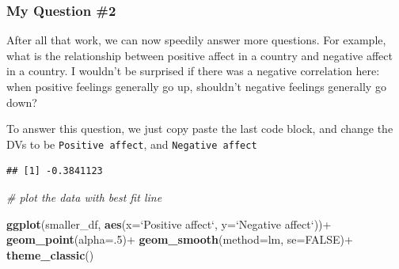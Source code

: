 \documentclass[]{book}
\newenvironment{Shaded}{\begin{snugshade}}{\end{snugshade}}
\newcommand{\KeywordTok}[1]{\textcolor[rgb]{0.13,0.29,0.53}{\textbf{{#1}}}}
\newcommand{\DataTypeTok}[1]{\textcolor[rgb]{0.13,0.29,0.53}{{#1}}}
\newcommand{\DecValTok}[1]{\textcolor[rgb]{0.00,0.00,0.81}{{#1}}}
\newcommand{\StringTok}[1]{\textcolor[rgb]{0.31,0.60,0.02}{{#1}}}
\newcommand{\CommentTok}[1]{\textcolor[rgb]{0.56,0.35,0.01}{\textit{{#1}}}}
\newcommand{\OtherTok}[1]{\textcolor[rgb]{0.56,0.35,0.01}{{#1}}}
\newcommand{\NormalTok}[1]{{#1}}
\theoremstyle{definition}
\theoremstyle{definition}
\theoremstyle{definition}
\theoremstyle{remark}
\begin{document}
\subsubsection{My Question \#2}\label{my-question-2}

After all that work, we can now speedily answer more questions. For
example, what is the relationship between positive affect in a country
and negative affect in a country. I wouldn't be surprised if there was a
negative correlation here: when positive feelings generally go up,
shouldn't negative feelings generally go down?

To answer this question, we just copy paste the last code block, and
change the DVs to be \texttt{Positive\ affect}, and
\texttt{Negative\ affect}

\begin{Shaded}
\end{Shaded}

\begin{verbatim}
## [1] -0.3841123
\end{verbatim}

\begin{Shaded}
\begin{Highlighting}[]
\CommentTok{# plot the data with best fit line}

\KeywordTok{ggplot}\NormalTok{(smaller_df, }\KeywordTok{aes}\NormalTok{(}\DataTypeTok{x=}\StringTok{`}\DataTypeTok{Positive affect}\StringTok{`}\NormalTok{,}
                     \DataTypeTok{y=}\StringTok{`}\DataTypeTok{Negative affect}\StringTok{`}\NormalTok{))+}
\StringTok{  }\KeywordTok{geom_point}\NormalTok{(}\DataTypeTok{alpha=}\NormalTok{.}\DecValTok{5}\NormalTok{)+}
\StringTok{  }\KeywordTok{geom_smooth}\NormalTok{(}\DataTypeTok{method=}\NormalTok{lm, }\DataTypeTok{se=}\OtherTok{FALSE}\NormalTok{)+}
\StringTok{  }\KeywordTok{theme_classic}\NormalTok{()}
\end{Highlighting}
\end{Shaded}
\end{document}
